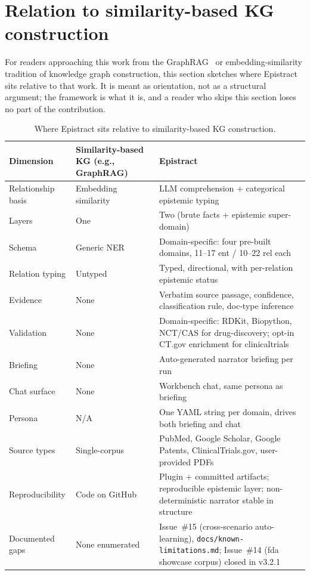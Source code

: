 \section{Relation to similarity-based KG construction}
\label{sec:evolution}

For readers approaching this work from the GraphRAG~\cite{edge2024graphrag} or embedding-similarity tradition of knowledge graph construction, this section sketches where Epistract sits relative to that work. It is meant as orientation, not as a structural argument; the framework is what it is, and a reader who skips this section loses no part of the contribution.

\begin{table}[t]
\centering
\caption{Where Epistract sits relative to similarity-based KG construction.}
\label{tab:evolution-three}
\small
\begin{tabular}{@{}lp{3.5cm}p{6.0cm}@{}}
\toprule
\textbf{Dimension} & \textbf{Similarity-based KG (e.g., GraphRAG)} & \textbf{Epistract} \\
\midrule
Relationship basis   & Embedding similarity                & LLM comprehension + categorical epistemic typing \\
Layers               & One                                 & Two (brute facts + epistemic super-domain) \\
Schema               & Generic NER                         & Domain-specific: four pre-built domains, 11--17 ent / 10--22 rel each \\
Relation typing      & Untyped                             & Typed, directional, with per-relation epistemic status \\
Evidence             & None                                & Verbatim source passage, confidence, classification rule, doc-type inference \\
Validation           & None                                & Domain-specific: RDKit, Biopython, NCT/CAS for drug-discovery; opt-in CT.gov enrichment for clinicaltrials \\
Briefing             & None                                & Auto-generated narrator briefing per run \\
Chat surface         & None                                & Workbench chat, same persona as briefing \\
Persona              & N/A                                 & One YAML string per domain, drives both briefing and chat \\
Source types         & Single-corpus                       & PubMed, Google Scholar, Google Patents, ClinicalTrials.gov, user-provided PDFs \\
Reproducibility      & Code on GitHub                      & Plugin + committed artifacts; reproducible epistemic layer; non-deterministic narrator stable in structure \\
Documented gaps      & None enumerated                     & Issue~\#15 (cross-scenario auto-learning), \texttt{docs/known-limitations.md}; Issue~\#14 (fda showcase corpus) closed in v3.2.1 \\
\bottomrule
\end{tabular}
\end{table}

